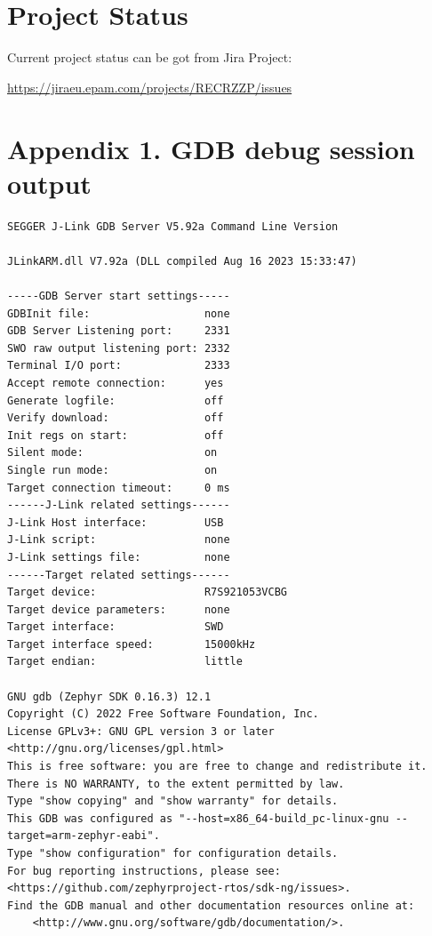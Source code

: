 \documentclass[11pt,a4paper,oneside]{article}
\begin{document}
\section{Project Status}\label{project-status}

Current project status can be got from Jira Project:

\url{https://jiraeu.epam.com/projects/RECRZZP/issues}

\section*{Appendix 1. GDB debug session
output}\label{appendix-1.-gdb-debug-session-output}

\begin{lstlisting}
SEGGER J-Link GDB Server V5.92a Command Line Version

JLinkARM.dll V7.92a (DLL compiled Aug 16 2023 15:33:47)

-----GDB Server start settings-----
GDBInit file:                  none
GDB Server Listening port:     2331
SWO raw output listening port: 2332
Terminal I/O port:             2333
Accept remote connection:      yes
Generate logfile:              off
Verify download:               off
Init regs on start:            off
Silent mode:                   on
Single run mode:               on
Target connection timeout:     0 ms
------J-Link related settings------
J-Link Host interface:         USB
J-Link script:                 none
J-Link settings file:          none
------Target related settings------
Target device:                 R7S921053VCBG
Target device parameters:      none
Target interface:              SWD
Target interface speed:        15000kHz
Target endian:                 little

GNU gdb (Zephyr SDK 0.16.3) 12.1
Copyright (C) 2022 Free Software Foundation, Inc.
License GPLv3+: GNU GPL version 3 or later <http://gnu.org/licenses/gpl.html>
This is free software: you are free to change and redistribute it.
There is NO WARRANTY, to the extent permitted by law.
Type "show copying" and "show warranty" for details.
This GDB was configured as "--host=x86_64-build_pc-linux-gnu --target=arm-zephyr-eabi".
Type "show configuration" for configuration details.
For bug reporting instructions, please see:
<https://github.com/zephyrproject-rtos/sdk-ng/issues>.
Find the GDB manual and other documentation resources online at:
    <http://www.gnu.org/software/gdb/documentation/>.


\end{lstlisting}
\end{document}
